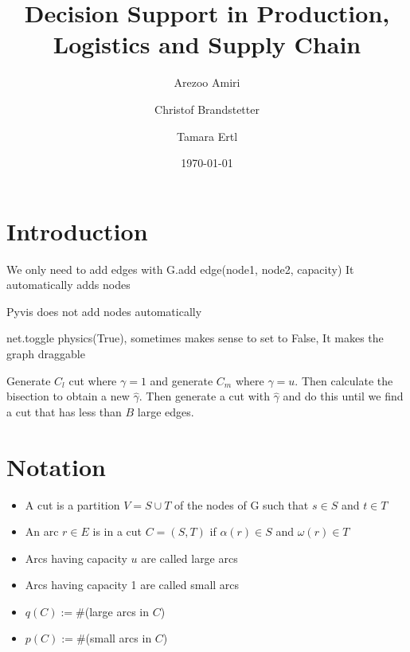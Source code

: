 \documentclass{article}
\title{Decision Support in Production, Logistics and Supply Chain}
\author{Arezoo Amiri \and Christof Brandstetter \and Tamara Ertl}
\date{\today}
\begin{document}
\maketitle

\section{Introduction}
We only need to add edges with G.add edge(node1, node2, capacity)
It automatically adds nodes

Pyvis does not add nodes automatically

net.toggle physics(True), sometimes makes sense to set to False, It makes the graph draggable

Generate $C_l$ cut where $\gamma = 1$ and generate $C_m$ where $\gamma = u$.
Then calculate the bisection to obtain a new $\hat{\gamma}$. 
Then generate a cut with $\hat{\gamma}$ and do this until we find a cut that has less than $B$ large edges.

\section{Notation}
\begin{itemize}
    \item A cut is a partition $V  = S \cup T$ of the nodes of G such that $s \in S$ and $t \in T$
    \item An arc $r \in E$ is in a cut $C = (S,T)$ if $\alpha(r) \in S$ and $\omega(r) \in T$
    \item Arcs having capacity $u$ are called large arcs
    \item Arcs having capacity 1 are called small arcs
    \item $q(C) := \#$(large arcs in $C$)
    \item $p(C) := \#$(small arcs in $C$)
\end{itemize}
\end{document}
